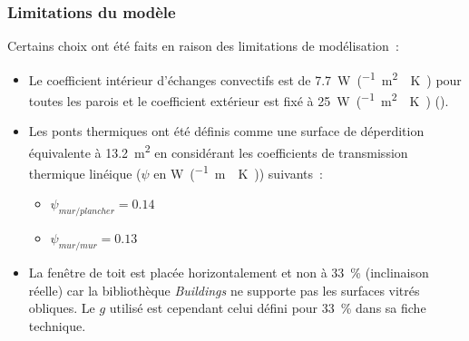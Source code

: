 \subsubsection{Limitations du modèle} %
\label{ssub:limitations_du_modele}
Certains choix ont été faits en raison des limitations de modélisation~:
\begin{itemize}
    \item Le coefficient intérieur d’échanges convectifs est de \SI{7.7}{\watt\per(\meter\squared\period\kelvin)}
          pour toutes les parois et le coefficient extérieur
          est fixé à \SI{25}{\watt\per(\meter\squared\period\kelvin)} (\textcite{NFENISO6946}).
    \item Les ponts thermiques ont été définis comme une surface de déperdition
          équivalente à \SI{13.2}{\meter\squared} en considérant les coefficients de transmission
          thermique linéique ($\psi$ en \si{\watt\per(\metre\period\kelvin)}) suivants~:
          \begin{itemize}
              \item $\psi_{mur / plancher} = \num{0.14}$
              \item $\psi_{mur / mur} = \num{0.13}$
          \end{itemize}
    \item La fenêtre de toit est placée horizontalement et non à \SI{33}{\percent}
          (inclinaison réelle) car la bibliothèque \textit{Buildings} ne supporte pas les
          surfaces vitrés obliques. Le $g$ utilisé est cependant celui défini
          pour \SI{33}{\percent} dans sa fiche technique.
\end{itemize}


